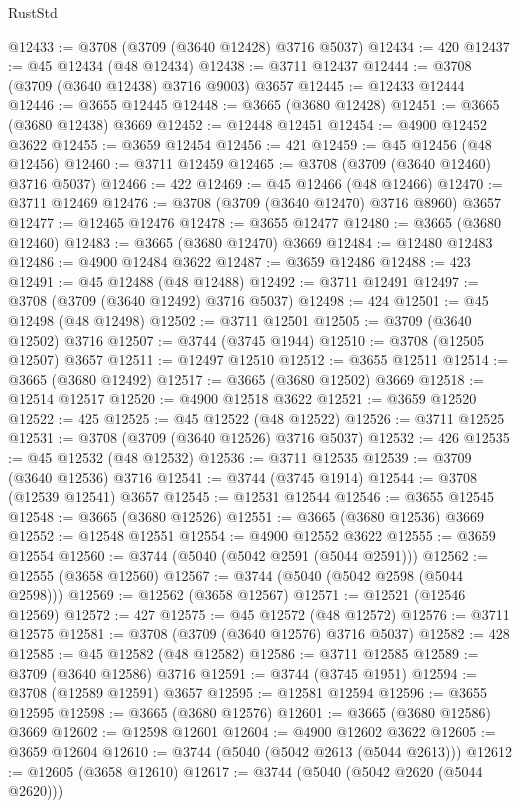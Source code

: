 \begin{lexlean}{RustStd}
\begin{coremodule}
@12433 := @3708 (@3709 (@3640 @12428) @3716 @5037)
@12434 := 420
@12437 := @45 @12434 (@48 @12434)
@12438 := @3711 @12437
@12444 := @3708 (@3709 (@3640 @12438) @3716 @9003) @3657
@12445 := @12433 @12444
@12446 := @3655 @12445
@12448 := @3665 (@3680 @12428)
@12451 := @3665 (@3680 @12438) @3669
@12452 := @12448 @12451
@12454 := @4900 @12452 @3622
@12455 := @3659 @12454
@12456 := 421
@12459 := @45 @12456 (@48 @12456)
@12460 := @3711 @12459
@12465 := @3708 (@3709 (@3640 @12460) @3716 @5037)
@12466 := 422
@12469 := @45 @12466 (@48 @12466)
@12470 := @3711 @12469
@12476 := @3708 (@3709 (@3640 @12470) @3716 @8960) @3657
@12477 := @12465 @12476
@12478 := @3655 @12477
@12480 := @3665 (@3680 @12460)
@12483 := @3665 (@3680 @12470) @3669
@12484 := @12480 @12483
@12486 := @4900 @12484 @3622
@12487 := @3659 @12486
@12488 := 423
@12491 := @45 @12488 (@48 @12488)
@12492 := @3711 @12491
@12497 := @3708 (@3709 (@3640 @12492) @3716 @5037)
@12498 := 424
@12501 := @45 @12498 (@48 @12498)
@12502 := @3711 @12501
@12505 := @3709 (@3640 @12502) @3716
@12507 := @3744 (@3745 @1944)
@12510 := @3708 (@12505 @12507) @3657
@12511 := @12497 @12510
@12512 := @3655 @12511
@12514 := @3665 (@3680 @12492)
@12517 := @3665 (@3680 @12502) @3669
@12518 := @12514 @12517
@12520 := @4900 @12518 @3622
@12521 := @3659 @12520
@12522 := 425
@12525 := @45 @12522 (@48 @12522)
@12526 := @3711 @12525
@12531 := @3708 (@3709 (@3640 @12526) @3716 @5037)
@12532 := 426
@12535 := @45 @12532 (@48 @12532)
@12536 := @3711 @12535
@12539 := @3709 (@3640 @12536) @3716
@12541 := @3744 (@3745 @1914)
@12544 := @3708 (@12539 @12541) @3657
@12545 := @12531 @12544
@12546 := @3655 @12545
@12548 := @3665 (@3680 @12526)
@12551 := @3665 (@3680 @12536) @3669
@12552 := @12548 @12551
@12554 := @4900 @12552 @3622
@12555 := @3659 @12554
@12560 := @3744 (@5040 (@5042 @2591 (@5044 @2591)))
@12562 := @12555 (@3658 @12560)
@12567 := @3744 (@5040 (@5042 @2598 (@5044 @2598)))
@12569 := @12562 (@3658 @12567)
@12571 := @12521 (@12546 @12569)
@12572 := 427
@12575 := @45 @12572 (@48 @12572)
@12576 := @3711 @12575
@12581 := @3708 (@3709 (@3640 @12576) @3716 @5037)
@12582 := 428
@12585 := @45 @12582 (@48 @12582)
@12586 := @3711 @12585
@12589 := @3709 (@3640 @12586) @3716
@12591 := @3744 (@3745 @1951)
@12594 := @3708 (@12589 @12591) @3657
@12595 := @12581 @12594
@12596 := @3655 @12595
@12598 := @3665 (@3680 @12576)
@12601 := @3665 (@3680 @12586) @3669
@12602 := @12598 @12601
@12604 := @4900 @12602 @3622
@12605 := @3659 @12604
@12610 := @3744 (@5040 (@5042 @2613 (@5044 @2613)))
@12612 := @12605 (@3658 @12610)
@12617 := @3744 (@5040 (@5042 @2620 (@5044 @2620)))

\end{coremodule}
\end{lexlean}
